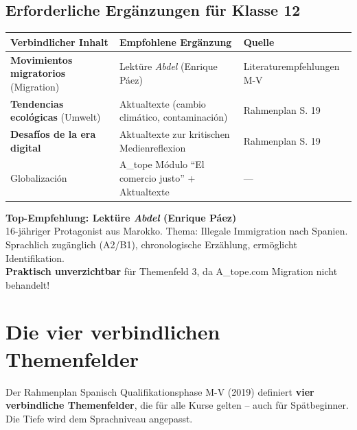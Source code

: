 \documentclass[10pt,a4paper]{article}
\begin{document}
\subsection{Erforderliche Ergänzungen für Klasse 12}

\begin{center}
\begin{tabular}{|p{3.5cm}|p{5cm}|p{4.5cm}|}
\hline
\rowcolor{spanisch}\color{white}\textbf{Verbindlicher Inhalt} & \color{white}\textbf{Empfohlene Ergänzung} & \color{white}\textbf{Quelle} \\
\hline
\textbf{Movimientos migratorios} (Migration) & Lektüre \textit{Abdel} (Enrique Páez) & Literaturempfehlungen M-V \\
\hline
\textbf{Tendencias ecológicas} (Umwelt) & Aktualtexte (cambio climático, contaminación) & Rahmenplan S. 19 \\
\hline
\textbf{Desafíos de la era digital} & Aktualtexte zur kritischen Medienreflexion & Rahmenplan S. 19 \\
\hline
Globalización & A\_tope Módulo ``El comercio justo'' + Aktualtexte & --- \\
\hline
\end{tabular}
\end{center}

\begin{empfehlungbox}
\textbf{Top-Empfehlung: Lektüre \textit{Abdel} (Enrique Páez)}\\[4pt]
16-jähriger Protagonist aus Marokko. Thema: Illegale Immigration nach Spanien.\\
Sprachlich zugänglich (A2/B1), chronologische Erzählung, ermöglicht Identifikation.\\[4pt]
\textbf{Praktisch unverzichtbar} für Themenfeld 3, da A\_tope.com Migration nicht behandelt!
\end{empfehlungbox}

\newpage


\section{Die vier verbindlichen Themenfelder}

Der Rahmenplan Spanisch Qualifikationsphase M-V (2019) definiert \textbf{vier verbindliche Themenfelder}, die für alle Kurse gelten -- auch für Spätbeginner. Die Tiefe wird dem Sprachniveau angepasst.
\end{document}
